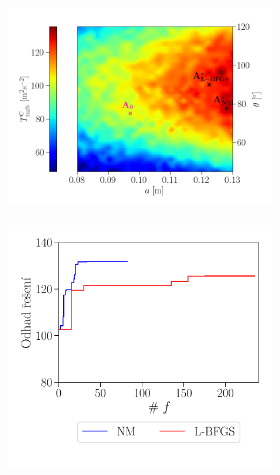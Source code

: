 \begin{figure}[H]
	\begin{subfigure}[b]{1.0\textwidth}		
	\begin{subfigure}[b]{0.61\textwidth}		
		\hspace{-19mm}
		\centering
		\includegraphics[width=1.06\textwidth, trim={0mm 4mm 0 6mm}]{Images/1full.png}
		\vspace{3mm}
	\end{subfigure}
	\begin{subfigure}[b]{0.001\textwidth}
		\centering
		\hspace{1mm}
	\end{subfigure}	
	\begin{subfigure}[b]{0.38\textwidth}
		\centering
		\vspace{-2mm}
		\includegraphics[width=1.1\textwidth, trim={12mm 0 0 0mm}]{Images/1.pdf}

\end{subfigure}
\end{subfigure}
\end{figure}
